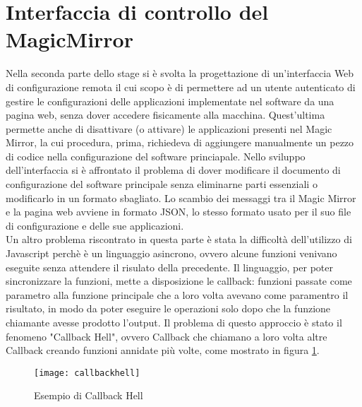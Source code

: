 \section{Interfaccia di controllo del MagicMirror}
Nella seconda parte dello stage si \`e svolta la progettazione di un'interfaccia Web di configurazione remota
il cui scopo \`e di permettere ad un utente autenticato di gestire
le configurazioni delle applicazioni implementate nel software da una pagina web,
senza dover accedere fisicamente alla macchina.
Quest'ultima permette anche di disattivare (o attivare) le applicazioni presenti nel Magic Mirror,
la cui procedura, prima, richiedeva di aggiungere manualmente un pezzo di codice nella
configurazione del software princiapale.
Nello sviluppo dell'interfaccia si \`e affrontato il problema di dover modificare
il documento di configurazione del software principale senza eliminarne parti essenziali
o modificarlo in un formato sbagliato.
Lo scambio dei messaggi tra il Magic Mirror e la pagina web avviene in formato JSON, lo stesso formato
usato per il suo file di configurazione e delle sue applicazioni.\\
Un altro problema riscontrato in questa parte è stata la difficoltà dell'utilizzo di Javascript
perchè \`e un linguaggio asincrono, ovvero alcune funzioni venivano eseguite senza attendere
il risulato della precedente. Il linguaggio, per poter sincronizzare la funzioni, mette a disposizione
le callback: funzioni passate come parametro alla funzione principale che a loro volta avevano come paramentro il risultato,
in modo da poter eseguire le operazioni solo dopo che la funzione chiamante avesse prodotto l'output.
Il problema di questo approccio \`e stato il fenomeno "Callback Hell", ovvero Callback che chiamano a loro volta
altre Callback creando funzioni annidate pi\`u volte, come mostrato in figura \ref{fig:hell}.
\\[2\baselineskip]
\begin{figure}[h]
    \texttt{[image: callbackhell]}
    \caption{Esempio di Callback Hell}
    \label{fig:hell}
\end{figure}
